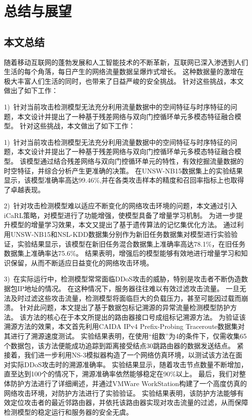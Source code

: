 \chapter{总结与展望}
\label{cha:over_view}

\section{本文总结}


随着移动互联网的蓬勃发展和人工智能技术的不断革新，互联网已深入渗透到人们生活的每个角落，每日产生的网络流量数据呈爆炸式增长。
这种数据量的激增在极大丰富人们生活的同时，也带来了日益严峻的安全挑战。
针对这些挑战，本文做出了如下工作：\par
1)~针对当前攻击检测模型无法充分利用流量数据中的空间特征与时序特征的问题，本文设计并提出了一种基于残差网络与双向门控循环单元多模态特征融合模型。
针对这些挑战，本文做出了如下工作：\par
1)~针对当前攻击检测模型无法充分利用流量数据中的空间特征与时序特征的问题，本文设计并提出了一种基于残差网络与双向门控循环单元多模态特征融合模型。
该模型通过结合残差网络与双向门控循环单元的特性，有效挖掘流量数据的时空特征，并综合分析产生更准确的决策。
在UNSW-NB15数据集上的实验结果显示，该模型准确率高达99.46\%,并在各类攻击样本的精度和召回率指标上也取得了卓越表现。\par

2)~针对攻击检测模型难以适应不断变化的网络攻击环境的问题，本文通过引入iCaRL策略，对模型进行了功能增强，使模型具备了增量学习机制。
为进一步提升模型的增量学习效果，本文又提出了基于遗传算法的记忆集优化方法。
通过利用UNSW-NB15和NSL-KDD数据集分别作为新旧任务数据集对模型进行实验验证，实验结果显示，该模型在新旧任务混合数据集上准确率高达78.1\%，在旧任务数据集上准确率达75.6\%。
结果表明，增强后的模型能够有效地进行增量学习和知识保留，从而不断适应日益变化的网络攻击环境。\par


3)~在实际运行中，检测模型常常面临DDoS攻击的威胁，特别是攻击者不断伪造数据包IP地址的情况。
在这种情况下，服务器往往难以有效过滤攻击流量。
一旦无法及时过滤这些攻击流量，检测模型将面临巨大的负载压力，甚至可能因过载而崩溃。
针对此问题，本文提出了基于数据包标记溯源的异常流量检测模型防护方法。
该方法的核心在于本文所提出的路由器接口号成组标记溯源方法。
为验证该溯源方法的效果，本文首先利用CAIDA IPv4 Prefix-Probing Traceroute数据集对其进行了溯源速度测试。
实验结果表明，在使用“组数”为4的条件下，仅需收集65个数据包，该方法便能成功追踪到距离接受结点30跳路由器的数据发送结点。
紧接着，我们进一步利用NS-3模拟器构造了一个网络仿真环境，以测试该方法在面对实际DDoS攻击时的溯源准确率。
实验结果显示，随着攻击节点数量不断增加，直至达到100个的情况下，溯源准确率依然能够稳定在90\%以上。
最后，我们对整体防护方法进行了详细阐述，并通过VMWare WorkStation构建了一个高度仿真的网络攻击环境，对防护方法进行了实验验证。
实验结果表明，该防护方法能够有效定位攻击者的最近邻路由器，并依托该路由器实现对攻击流量的过滤，从而保障检测模型的稳定运行和服务器的安全无虞。

